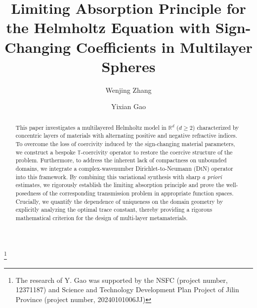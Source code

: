 \documentclass[12pt,reqno]{amsart}
\numberwithin{equation}{section}
\begin{document}
	
	
\title[Limiting Absorption Principle in Multilayer Spheres ] {Limiting Absorption Principle for the Helmholtz Equation with Sign-Changing Coefficients in Multilayer Spheres}
	


\author{Wenjing Zhang}
\address{School of
Mathematics and Statistics,  Northeast Normal University, Changchun, Jilin 130024, China }
	
\author{Yixian Gao}
\address{School of
Mathematics and Statistics, Center for Mathematics and
Interdisciplinary Sciences, Northeast Normal University, Changchun, Jilin 130024, China. }




	
\thanks{  The research of Y. Gao was supported by the NSFC
(project number, 12371187) and Science and Technology Development Plan Project of Jilin Province (project number, 20240101006JJ)}
	
	
	


\begin{abstract}
This paper investigates a multilayered Helmholtz model in $\mathbb{R}^d$ ($d \ge 2$) characterized by concentric layers of materials with alternating positive and negative refractive indices. To overcome the loss of coercivity induced by the sign-changing material parameters, we construct a bespoke $\mathbb T$-coercivity operator to restore the coercive structure of the problem. Furthermore, to address the inherent lack of compactness on unbounded domains, we integrate a complex-wavenumber Dirichlet-to-Neumann (DtN) operator into this framework. By combining this variational synthesis with sharp \textit{a priori} estimates, we rigorously establish the limiting absorption principle and prove the well-posedness of the corresponding transmission problem in appropriate function spaces. Crucially, we quantify the dependence of uniqueness on the domain geometry by explicitly analyzing the optimal trace constant, thereby providing a rigorous mathematical criterion for the design of multi-layer metamaterials.
\end{abstract}
	

	
\maketitle
	
\end{document}
